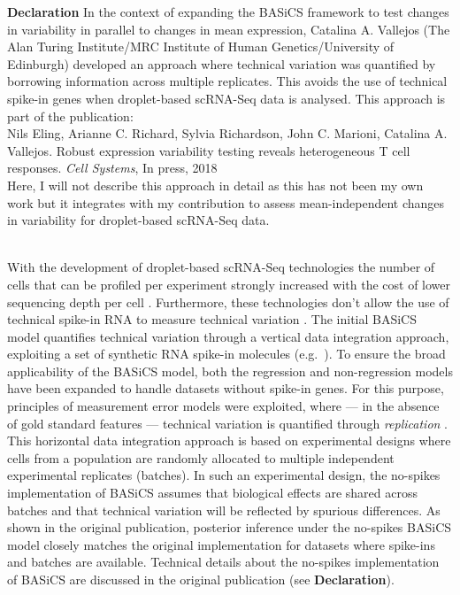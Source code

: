 \begin{Comment}
\textbf{Declaration} In the context of expanding the BASiCS framework to test changes in variability in parallel to changes in mean expression, Catalina A. Vallejos (The Alan Turing Institute/MRC Institute of Human Genetics/University of Edinburgh) developed an approach where technical variation was quantified by borrowing information across multiple replicates. This avoids the use of technical spike-in genes when droplet-based scRNA-Seq data is analysed. This approach is part of the publication:\\

Nils Eling, Arianne C. Richard, Sylvia Richardson, John C. Marioni, Catalina A. Vallejos. Robust expression variability testing reveals heterogeneous T cell responses. \emph{Cell Systems}, In press, 2018 \\

Here, I will not describe this approach in detail as this has not been my own work but it integrates with my contribution to assess mean-independent changes in variability for droplet-based scRNA-Seq data.
\end{Comment}\\

With the development of droplet-based scRNA-Seq technologies the number of cells that can be profiled per experiment strongly increased with the cost of lower sequencing depth per cell \citep{Macosko2015, Klein2015, Zheng2017}. Furthermore, these technologies don't allow the use of technical spike-in RNA to measure technical variation \citep{Brennecke2013}. The initial BASiCS model \citep{Vallejos2015BASiCS, Vallejos2016} quantifies technical variation through a vertical data integration approach, exploiting a set of synthetic RNA spike-in molecules (e.g.~\citep{Jiang2011}). To ensure the broad applicability of the BASiCS model, both the regression and non-regression models have been expanded to 
handle datasets without spike-in genes. For this purpose, principles of measurement error models were exploited, where --- in the absence of gold standard features --- technical variation is quantified through {\it replication} \citep{Carroll1998}. This horizontal data integration approach is based on experimental designs where cells from a population are randomly allocated to multiple independent experimental replicates (batches). In such an experimental design, the no-spikes implementation of BASiCS assumes that biological effects are shared across batches and that technical variation will be reflected by spurious differences.  As shown in the original publication, posterior inference under the no-spikes BASiCS model closely matches the original implementation for datasets where spike-ins and batches are available. Technical details about the no-spikes implementation of BASiCS are discussed in the original publication (see \textbf{Declaration}).

